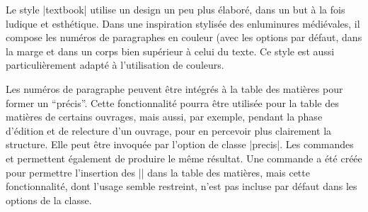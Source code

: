 Le style |textbook| utilise un design un peu plus élaboré, dans un but à la fois ludique et esthétique. Dans une inspiration stylisée des enluminures médiévales, il compose les numéros de paragraphes en couleur (avec les options par défaut, dans la marge et dans un corps bien supérieur à celui du texte. Ce style est aussi particulièrement adapté à l'utilisation de couleurs.

\begin{noprint}
\end{noprint}

Les numéros de paragraphe peuvent être intégrés à la table des matières pour former un \enquote{précis}. Cette fonctionnalité pourra être utilisée pour la table des matières de certains ouvrages, mais aussi, par exemple, pendant la phase d'édition et de relecture d'un ouvrage, pour en percevoir plus clairement la structure. Elle peut être invoquée par l'option de classe |precis|. Les commandes  et  permettent également de produire le même résultat. Une commande  a été créée pour permettre l'insertion des |\subpara| dans la table des matières, mais cette fonctionnalité, dont l'usage semble restreint, n'est pas incluse par défaut dans les options de la classe.


\begin{noprint}
\newcommand{\precis}{\@precistrue}
\newcommand{\subprecis}{\@subprecistrue}
\newcommand{\noprecis}{\@precisfalse\@subprecisfalse}
\end{noprint}

